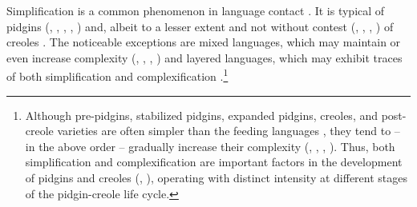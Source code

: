 \documentclass[output=paper,hidelinks]{langscibook}
\begin{document}
Simplification is a common phenomenon in language contact \citep{mcwhorter_identifying_1998, mcwhorter_worlds_2001, matras_grammatical_2007}. 
It is typical of pidgins (\citealt{muhlhausler_pidginisation_1977, muhlhausler_pidgin_1986, trudgill_dialects_1986, trudgill_dual-source_1996}, \citeyear[306--308]{trudgill_contact_2010}, \citealt{kusters_linguistic_2003}, \citealt[190]{siegel_pidginscreoles_2008}, \citealt[321--322]{juvonen_complexity_2008})
and, albeit to a lesser extent and not without contest (\citealt{degraff_against_2003, degraff_linguists_2005}, \citealt[12--14]{ansaldo_deconstructing_2007}, \citealt[300]{hammarstrom_complexity_2008}, \citealt{bakker_creoles_2011}) of creoles \citep{mcwhorter_identifying_1998, mcwhorter_worlds_2001, mcwhorter_defining_2005, seuren_semantic_2001, parkvall_simplicity_2008}. 
The noticeable exceptions are mixed languages, which may maintain or even increase complexity (\citealt[288, 305]{matras_language_2009}, \citealt{meakins_mixed_2013}, \citealt[301--307, 329--330, 402]{velupillai_pidgins_2015}, \citealt[296--297, 326--327]{meakins_birth_2019}) and layered languages, which may exhibit traces of both simplification and complexification \citep[42--43]{aikhenvald_grammars_2007}.\footnote{Although pre\nobreakdash-pidgins, stabilized pidgins, expanded pidgins, creoles, and post-creole varieties are often simpler than the feeding languages \citep{velupillai_pidgins_2015}, they tend to – in the above order – gradually increase their complexity (\citealt[5--11]{muhlhausler_pidgin_1986}, \citealt[281]{parkvall_simplicity_2008}, \citealt[306]{trudgill_contact_2010}, \citealt{velupillai_pidgins_2015}). Thus, both simplification and complexification are important factors in the development of pidgins and creoles (\citealt[258]{heine_language_2005}, \citealt[309]{trudgill_contact_2010}), operating with distinct intensity at different stages of the pidgin-creole life cycle.}
\end{document}
